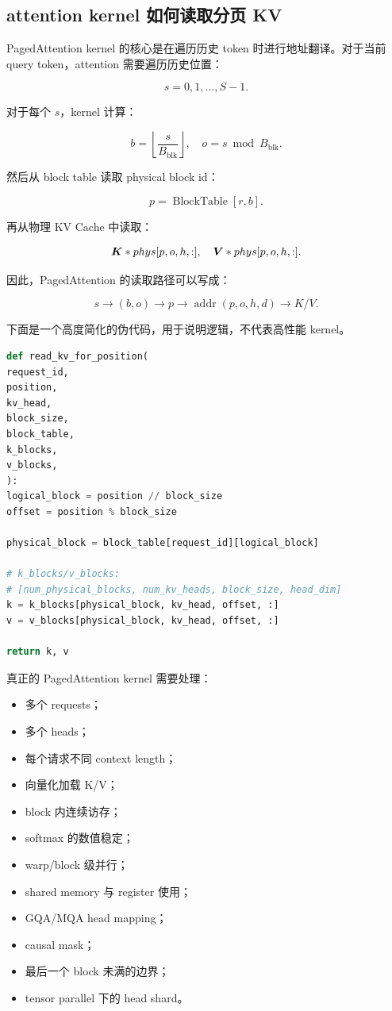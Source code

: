 \subsection{attention kernel 如何读取分页 KV}
\label{subsec:how-attention-kernel-reads-paged-kv}

PagedAttention kernel 的核心是在遍历历史 token 时进行地址翻译。对于当前 query token，attention 需要遍历历史位置：

\[
s=0,1,\ldots,S-1.
\]

对于每个 $s$，kernel 计算：

\[
b=\left\lfloor\frac{s}{B_{\mathrm{blk}}}\right\rfloor,
\quad
o=s\bmod B_{\mathrm{blk}}.
\]

然后从 block table 读取 physical block id：

\[
p=\operatorname{BlockTable}[r,b].
\]

再从物理 KV Cache 中读取：

\[
\bm{K}*{phys}[p,o,h,:],
\quad
\bm{V}*{phys}[p,o,h,:].
\]

因此，PagedAttention 的读取路径可以写成：

\[
s
\rightarrow
(b,o)
\rightarrow
p
\rightarrow
\operatorname{addr}(p,o,h,d)
\rightarrow
K/V.
\]

下面是一个高度简化的伪代码，用于说明逻辑，不代表高性能 kernel。

\begin{lstlisting}[language=Python,caption={PagedAttention 中根据 block table 读取 KV 的伪代码},label={lst:pagedattention-read-kv-pseudocode}]
def read_kv_for_position(
request_id,
position,
kv_head,
block_size,
block_table,
k_blocks,
v_blocks,
):
logical_block = position // block_size
offset = position % block_size

physical_block = block_table[request_id][logical_block]

# k_blocks/v_blocks:
# [num_physical_blocks, num_kv_heads, block_size, head_dim]
k = k_blocks[physical_block, kv_head, offset, :]
v = v_blocks[physical_block, kv_head, offset, :]

return k, v

\end{lstlisting}

真正的 PagedAttention kernel 需要处理：

\begin{itemize}
\item 多个 requests；
\item 多个 heads；
\item 每个请求不同 context length；
\item 向量化加载 K/V；
\item block 内连续访存；
\item softmax 的数值稳定；
\item warp/block 级并行；
\item shared memory 与 register 使用；
\item GQA/MQA head mapping；
\item causal mask；
\item 最后一个 block 未满的边界；
\item tensor parallel 下的 head shard。
\end{itemize}

